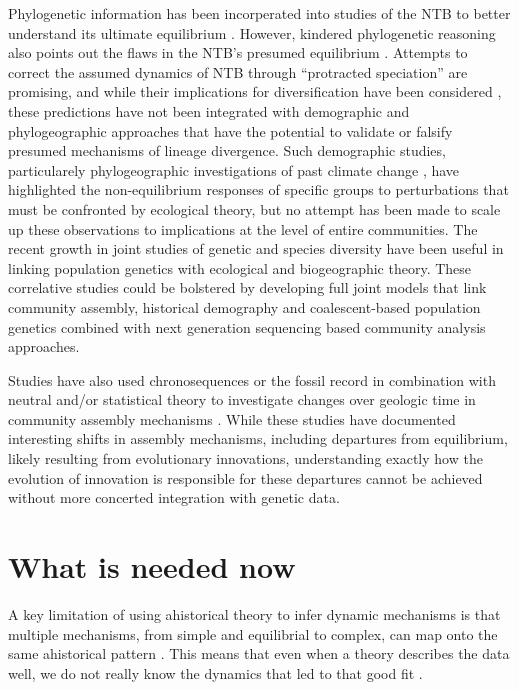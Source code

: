 \documentclass[12pt]{article}
\begin{document}
Phylogenetic information has been incorperated into studies of the NTB
to better understand its ultimate equilibrium \citep{jabot2009,
  burbrink2015}.  However, kindered phylogenetic reasoning also points
out the flaws in the NTB's presumed equilibrium \citep{ricklefs2006}.
Attempts to correct the assumed dynamics of NTB through ``protracted
speciation'' \citep{rosindell2010} are promising, and while their
implications for diversification have been considered
\citep{etienne2011}, these predictions have not been integrated with
demographic and phylogeographic approaches
\citep[e.g.,][]{charlesworth2010, edwards2000, prado-martinez2013}
that have the potential to validate or falsify presumed mechanisms of
lineage divergence.  Such demographic studies, particularely
phylogeographic investigations of past climate change
\citep{smith2012, hickerson2005}, have highlighted the
non-equilibrium responses of specific groups to perturbations that
must be confronted by ecological theory, but no attempt has been made
to scale up these observations to implications at the level of entire
communities. The recent growth in joint studies of genetic and species
diversity \citep{vanoverbeke2015, vellend2005amnat, papadopoulou2011}
have been useful in linking population genetics with ecological and
biogeographic theory. These correlative studies could be bolstered by
developing full joint models that link community assembly, historical
demography and coalescent-based population genetics combined with next
generation sequencing based community analysis approaches.

Studies have also used chronosequences or the fossil record in
combination with neutral and/or statistical theory to investigate
changes over geologic time in community assembly mechanisms
\citep{wagner2006, rominger2015}. While these
studies have documented interesting shifts in assembly mechanisms,
including departures from equilibrium, likely resulting from
evolutionary innovations, understanding exactly how the evolution of
innovation is responsible for these departures cannot be achieved
without more concerted integration with genetic data.

\section{What is needed now}


A key limitation of using ahistorical theory to infer dynamic
mechanisms is that multiple mechanisms, from simple and equilibrial to
complex, can map onto the same ahistorical pattern
\citep{engen1996lnorm, mcgill2003}. This means that
even when a theory describes the data well, we do not really know the
dynamics that led to that good fit \citep{ricklefs2006}.
\end{document}
